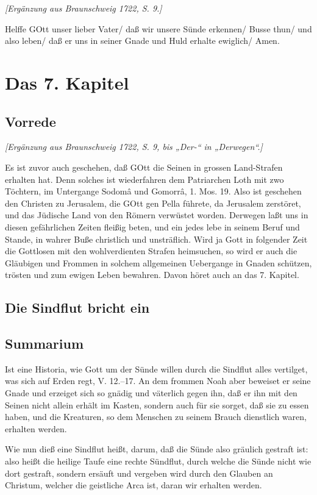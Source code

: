 \emph{[Ergänzung aus Braunschweig 1722, S. 9.]}

Helffe GOtt unser lieber Vater/ daß wir unsere Sünde erkennen/ Busse thun/ und also leben/ daß er uns in seiner Gnade und Huld erhalte ewiglich/ Amen.

\chapter{Das 7. Kapitel}

\section{Vorrede}

\emph{[Ergänzung aus Braunschweig 1722, S. 9, bis „Der-“ in „Derwegen“.]}

Es ist zuvor auch geschehen, daß GOtt die Seinen in grossen Land-Strafen erhalten hat. Denn solches ist wiederfahren dem Patriarchen Loth mit zwo Töchtern, im Untergange Sodomâ und Gomorrâ, 1. Mos. 19. Also ist geschehen den Christen zu Jerusalem, die GOtt gen Pella führete, da Jerusalem zerstöret, und das Jüdische Land von den Römern verwüstet worden. Derwegen
laßt uns in diesen gefährlichen Zeiten fleißig beten, und ein jedes lebe in seinem Beruf und Stande, in wahrer Buße christlich und unsträflich. Wird ja Gott in folgender Zeit die Gottlosen mit den wohlverdienten Strafen heimsuchen, so wird er auch die Gläubigen und Frommen in solchem allgemeinen Uebergange in Gnaden schützen, trösten und zum ewigen Leben bewahren. Davon höret auch an das 7. Kapitel.

\section{Die Sindflut bricht ein}

\section{Summarium}

Ist eine Historia, wie Gott um der Sünde willen durch die Sindflut alles vertilget, was sich auf Erden regt, V. 12.–17. An dem frommen Noah aber beweiset er seine Gnade und erzeiget sich so gnädig und väterlich gegen ihn, daß er ihn mit den Seinen nicht allein erhält im Kasten, sondern auch für sie sorget, daß sie zu essen haben, und die Kreaturen, so dem Menschen zu seinem Brauch dienstlich waren, erhalten werden.

Wie nun dieß eine Sindflut heißt, darum, daß die Sünde also gräulich gestraft ist: also heißt die heilige Taufe eine rechte Sündflut, durch
welche die Sünde nicht wie dort gestraft, sondern ersäuft und vergeben wird durch den Glauben an Christum, welcher die geistliche Arca ist, daran wir erhalten werden.

